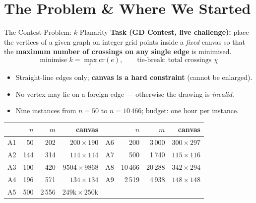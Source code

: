 \section{The Problem \& Where We Started}

\begin{frame}{The Contest Problem: $k$-Planarity}
  \textbf{Task (GD Contest, live challenge):} place the vertices of a given graph on integer
  grid points inside a \emph{fixed} canvas so that the \textbf{maximum number of crossings
  on any single edge} is minimised.
  \[
    \text{minimise } k=\max_e \mathrm{cr}(e), \qquad \text{tie-break: total crossings } \chi
  \]
  \begin{itemize}
    \item Straight-line edges only; \textbf{canvas is a hard constraint} (cannot be enlarged).
    \item No vertex may lie on a foreign edge --- otherwise the drawing is \emph{invalid}.
    \item Nine instances from $n=50$ to $n=10\,466$; budget: one hour per instance.
  \end{itemize}
  \begin{center}
    \scriptsize
    \setlength{\tabcolsep}{4pt}
    \begin{tabular}{lrrr@{\qquad}lrrr}
      \toprule
      & $n$ & $m$ & canvas & & $n$ & $m$ & canvas \\
      \midrule
      A1 & 50  & 202 & $200{\times}190$   & A6 & 200    & 3\,000  & $300{\times}297$ \\
      A2 & 144 & 314 & $114{\times}114$   & A7 & 500    & 1\,740  & $115{\times}116$ \\
      A3 & 100 & 420 & $9504{\times}9868$ & A8 & 10\,466 & 20\,288 & $342{\times}294$ \\
      A4 & 196 & 571 & $134{\times}134$   & A9 & 2\,519 & 4\,938  & $148{\times}148$ \\
      A5 & 500 & 2\,556 & $249\text{k}{\times}250\text{k}$ & & & & \\
      \bottomrule
    \end{tabular}
  \end{center}
\end{frame}

